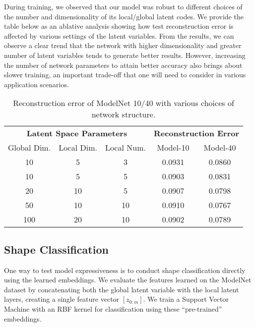 \documentclass[10pt,twocolumn,letterpaper]{article}
\begin{document}
During training, we observed that our model was robust to different choices of the number and dimensionality of its local/global latent codes. We provide the table below as an ablative analysis showing how test reconstruction error is affected by various settings of the latent variables. From the results, we can observe a clear trend that the network with higher dimensionality and greater number of latent variables tends to generate better results. However, increasing the number of network parameters to attain better accuracy also brings about slower training, an important trade-off that one will need to consider in various application scenarios.

\begin{table}[ht!]
  \centering
  \small
  \setlength\tabcolsep{2pt}
        \def\arraystretch{0.9}
    \begin{tabular}{ccccc}
    \multicolumn{3}{c}{\bf Latent Space Parameters} & \multicolumn{2}{c}{\bf Reconstruction Error} \\
    Global Dim. & Local Dim. & Local Num. & Model-10 & Model-40 \\
    \midrule
    10    & 5     & 3     & 0.0931       & 0.0860 \\
    10    & 5     & 5     & 0.0903      & 0.0831\\
    20    & 10    & 5     & 0.0907      & 0.0798 \\
    50    & 10    & 10    & 0.0910      &  0.0767\\
    100   & 20    & 10    & 0.0902      &  0.0789\\
    \end{tabular}
    \caption{Reconstruction error of ModelNet 10/40 with various choices of network structure. }
\end{table}
\vspace{-0.5em}

\subsection{Shape Classification}
\label{subsec:shapeclass}
One way to test model expressiveness is to conduct shape classification directly using the learned embeddings. We evaluate the features learned on the ModelNet dataset \cite{wu20153d} by concatenating both the global latent variable with the local latent layers, creating a single feature vector $[z_{0:m}]$. We train a Support Vector Machine with an RBF kernel for classification using these ``pre-trained'' embeddings.
\end{document}
